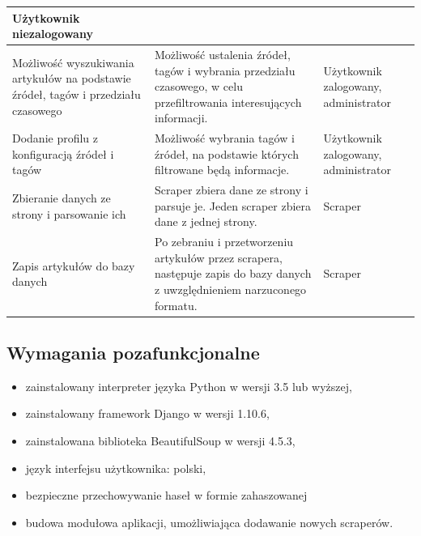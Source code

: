 \documentclass[12pt, titlepage]{article}
\begin{document}
\begin{longtable}{ | C{5cm} | C{8cm} | C{4.5cm} |}
		Użytkownik niezalogowany \\
		\hline
		Możliwość wyszukiwania artykułów na podstawie źródeł, tagów i przedziału czasowego &
		Możliwość ustalenia źródeł, tagów i wybrania przedziału czasowego, w celu przefiltrowania interesujących informacji. &
		Użytkownik zalogowany, administrator \\
		\hline
		Dodanie profilu z konfiguracją źródeł i tagów &
		Możliwość wybrania tagów i źródeł, na podstawie których filtrowane będą informacje. &
		Użytkownik zalogowany, administrator \\
		\hline
		Zbieranie danych ze strony i parsowanie ich &
		Scraper zbiera dane ze strony i parsuje je. Jeden scraper zbiera dane z jednej strony. &
		Scraper \\
		\hline
		Zapis artykułów do bazy danych &
		Po zebraniu i przetworzeniu artykułów przez scrapera, następuje zapis do bazy danych z uwzględnieniem narzuconego formatu. &
		Scraper \\
		\hline
	\end{longtable}

	\subsection{Wymagania pozafunkcjonalne}
		\begin{itemize}
		\item zainstalowany interpreter języka Python w wersji 3.5 lub wyższej,
		\item zainstalowany framework Django w wersji 1.10.6,
		\item zainstalowana biblioteka BeautifulSoup w wersji 4.5.3,
		\item język interfejsu użytkownika: polski,
		\item bezpieczne przechowywanie haseł w formie zahaszowanej
		\item budowa modułowa aplikacji, umożliwiająca dodawanie nowych scraperów.
		\newline
		\end{itemize}
\end{document}
